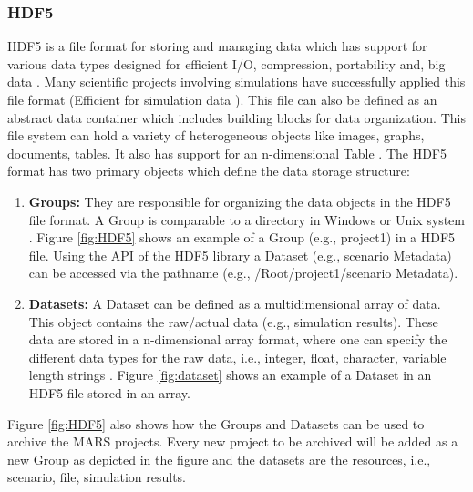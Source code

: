 \subsubsection{HDF5}
HDF5 is a file format for storing and managing data which has support for various data types designed for
efficient I/O, compression, portability and, big data \cite{HDF5}. Many scientific projects involving simulations have successfully applied this 
file format (Efficient
for simulation data \cite[p.~11]{Savic2007}). This file can also be defined as an abstract data container which includes building blocks for data organization. 
This file system can hold a variety of heterogeneous objects like images, graphs, documents, tables. It also has support for an n-dimensional Table \cite[p.~2]{HDF5}. 
The HDF5 format has two primary objects which define the data storage structure:
\begin{enumerate}
    \item \textbf{Groups:}  They are responsible for organizing the data objects in the HDF5 file format. A Group is comparable to a directory 
    in Windows or Unix system \cite{HDF5}. Figure \ref{fig:HDF5} shows an example of a Group (e.g., project1) in a HDF5 file. Using the API of the HDF5 library a Dataset 
    (e.g., scenario Metadata) can be accessed via the pathname (e.g., /Root/project1/scenario Metadata).
    \item \textbf{Datasets:} A Dataset can be defined as a multidimensional array of data. This object contains the raw/actual data (e.g., simulation results).
    These data are stored in a n-dimensional array format, where 
    one can specify the different data types for the raw data, i.e., integer, float, character, variable length strings \cite{HDF5}. Figure \ref{fig:dataset} shows
    an example of a Dataset in an HDF5 file stored in an array.
\end{enumerate}

Figure \ref{fig:HDF5} also shows how the Groups and Datasets can be used to archive the MARS projects. Every new project to be archived will be added as a new Group
as depicted in the figure and the datasets are the resources, i.e., scenario, file, simulation results. 


